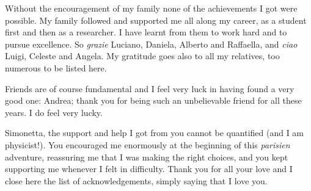 Without the encouragement of my family none of the achievements I got were possible. 
My family followed and supported 
me all along my career, as a student first and then as a researcher. I have learnt from them to work hard 
and to pursue excellence. So {\it grazie} Luciano, Daniela, Alberto and Raffaella, and {\it ciao} Luigi, Celeste 
and Angela. My gratitude goes also to all my relatives, too numerous to be listed here.

Friends are of course fundamental and I feel very luck in having found a very good one: Andrea; thank you 
for being such an unbelievable friend for all these years. I do feel very lucky. 


Simonetta, the support and help I got from you cannot be quantified (and I am physicist!).  You encouraged 
me enormously at the beginning of this {\it parisien} adventure,  reassuring me that I was making the right 
choices, and you kept supporting me whenever I felt in difficulty. Thank you for all your love and  I close here 
the list of acknowledgements, simply saying that I love you.











